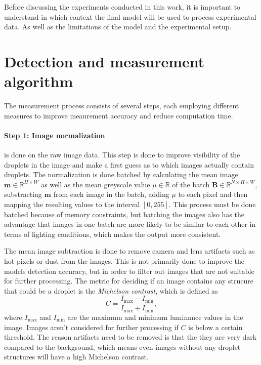 Before discussing the experiments conducted in this work, it is important to understand in which context the final model will be used to process experimental data. As well as the limitations of the model and the experimental setup.

\section{Detection and measurement algorithm}
\label{sec:algorithm}

The measurement process consists of several steps, each employing different measures to improve meaurement accuracy and reduce computation time.

\paragraph{Step 1: Image normalization} is done on the raw image data. This step is done to improve visibility of the droplets in the image and make a first guess as to which images actually contain droplets. 
The normalization is done batched by calculating the mean image $\mathbf{m}\in\mathbb{R}^{H\times W}$ as well as the mean greyscale value $\mu\in\mathbb{R}$ of the batch $\mathbf{B}\in\mathbb{R}^{N\times H\times W}$, substracting $\mathbf{m}$ from each image in the batch, adding $\mu$ to each pixel and then mapping the resulting values to the interval $[0,255]$.
This process must be done batched because of memory constraints, but batching the images also has the advantage that images in one batch are more likely to be similar to each other in terms of lighting conditions, which makes the output more consistent.

The mean image subtraction is done to remove camera and lens artifacts such as hot pixels or dust from the images.
This is not primarily done to improve the models detection accuracy, but in order to filter out images that are not suitable for further processing.
The metric for deciding if an image contains any strucure that could be a droplet is the \emph{Michelson contrast}, which is defined as 
$$
    C = \frac{I_\text{max}-I_\text{min}}{I_\text{max}+I_\text{min}},
$$
where $I_\text{max}$ and $I_\text{min}$ are the maximum and minimum luminance values in the image.
Images aren't considered for further processing if $C$ is below a certain threshold.
The reason artifacts need to be removed is that the they are very dark compared to the background, which means even images without any droplet structures will have a high Michelson contrast.

